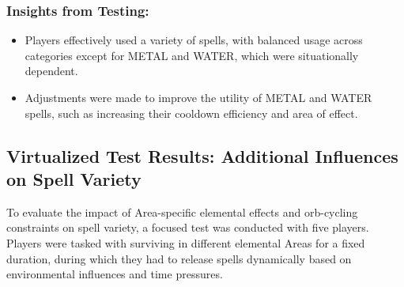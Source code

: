 \documentclass[10pt,twocolumn]{article}
\begin{document}
\begin{table}[h!]
\centering
\caption{Average Spell Usage by Primary Element}
\label{tab:average-spell-usage}
\end{table}


\subsubsection{Insights from Testing:}
\begin{itemize}
    \item Players effectively used a variety of spells, with balanced usage across categories except for METAL and WATER, which were situationally dependent.
    \item Adjustments were made to improve the utility of METAL and WATER spells, such as increasing their cooldown efficiency and area of effect.
\end{itemize}

\subsection{Virtualized Test Results: Additional Influences on Spell Variety}
To evaluate the impact of Area-specific elemental effects and orb-cycling constraints on spell variety, a focused test was conducted with five players. Players were tasked with surviving in different elemental Areas for a fixed duration, during which they had to release spells dynamically based on environmental influences and time pressures.
\end{document}
